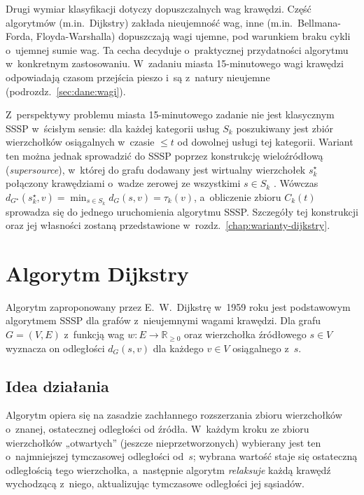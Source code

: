 Drugi wymiar klasyfikacji dotyczy dopuszczalnych wag krawędzi. Część
algorytmów (m.in.\ Dijkstry) zakłada nieujemność wag, inne
(m.in.\ Bellmana-Forda, Floyda-Warshalla) dopuszczają wagi ujemne, pod
warunkiem braku cykli o~ujemnej sumie wag. Ta cecha decyduje o~praktycznej
przydatności algorytmu w~konkretnym zastosowaniu. W~zadaniu miasta 15-minutowego wagi krawędzi odpowiadają czasom przejścia pieszo i~są z~natury
nieujemne (podrozdz.~\ref{sec:dane:wagi}).

Z~perspektywy problemu miasta 15-minutowego zadanie nie jest klasycznym SSSP
w~ścisłym sensie: dla każdej kategorii usług $S_k$ poszukiwany jest
zbiór wierzchołków osiągalnych w~czasie $\le t$ od dowolnej usługi tej
kategorii. Wariant ten można jednak sprowadzić do SSSP poprzez
konstrukcję wieloźródłową (\emph{supersource}), w~której do grafu
dodawany jest wirtualny wierzchołek $s^\star_k$ połączony krawędziami
o~wadze zerowej ze wszystkimi $s\in S_k$ \cite{Lam2024}. Wówczas
$d_{G^\star}(s^\star_k,v)=\min_{s\in S_k}d_G(s,v)=\tau_k(v)$, a~obliczenie
zbioru $C_k(t)$ sprowadza się do jednego uruchomienia algorytmu SSSP.
Szczegóły tej konstrukcji oraz jej własności zostaną przedstawione
w~rozdz.~\ref{chap:warianty-dijkstry}.

\section{Algorytm Dijkstry}
\label{sec:sssp:dijkstra}

Algorytm zaproponowany przez E.~W.~Dijkstrę w~1959 roku \cite{dijkstra}
jest podstawowym algorytmem SSSP dla grafów z~nieujemnymi wagami
krawędzi. Dla grafu $G=(V,E)$ z~funkcją wag $w:E\to\mathbb{R}_{\ge 0}$
oraz wierzchołka źródłowego $s\in V$ wyznacza on odległości $d_G(s,v)$
dla każdego $v\in V$ osiągalnego z~$s$.

\subsection{Idea działania}

Algorytm opiera się na zasadzie zachłannego rozszerzania zbioru
wierzchołków o~znanej, ostatecznej odległości od źródła. W~każdym kroku
ze zbioru wierzchołków „otwartych” (jeszcze nieprzetworzonych) wybierany
jest ten o~najmniejszej tymczasowej odległości od~$s$; wybrana wartość
staje się ostateczną odległością tego wierzchołka, a~następnie
algorytm \emph{relaksuje} każdą krawędź wychodzącą z~niego, aktualizując
tymczasowe odległości jej sąsiadów.

